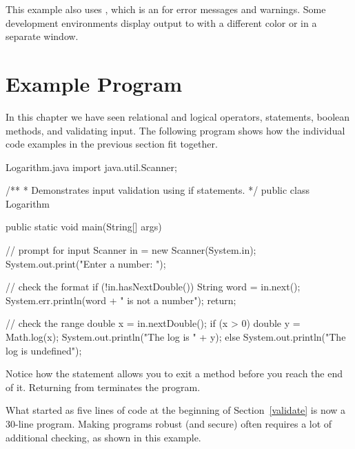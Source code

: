 
This example also uses , which is an  for error messages and warnings.
Some development environments display output to  with a different color or in a separate window.



\section{Example Program}

In this chapter we have seen relational and logical operators,  statements, boolean methods, and validating input.
The following program shows how the individual code examples in the previous section fit together.


\begin{trinket}{Logarithm.java}
import java.util.Scanner;

/**
 * Demonstrates input validation using if statements.
 */
public class Logarithm {

    public static void main(String[] args) {

        // prompt for input
        Scanner in = new Scanner(System.in);
        System.out.print("Enter a number: ");

        // check the format
        if (!in.hasNextDouble()) {
            String word = in.next();
            System.err.println(word + " is not a number");
            return;
        }

        // check the range
        double x = in.nextDouble();
        if (x > 0) {
            double y = Math.log(x);
            System.out.println("The log is " + y);
        } else {
            System.out.println("The log is undefined");
        }
    }
}
\end{trinket}


Notice how the  statement allows you to exit a method before you reach the end of it.
Returning from  terminates the program.

What started as five lines of code at the beginning of Section~\ref{validate} is now a 30-line program.
Making programs robust (and secure) often requires a lot of additional checking, as shown in this example.

